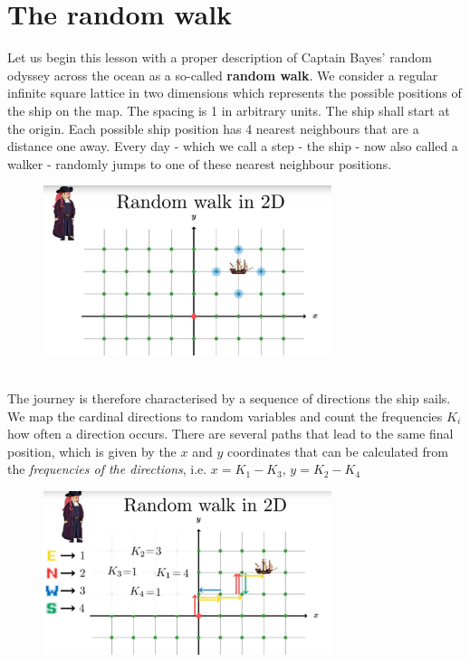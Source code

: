 \documentclass[12pt, a4paper]{scrartcl}
\begin{document}
\section*{The random walk}
Let us begin this lesson with a proper description of Captain Bayes' random odyssey across the ocean as a so-called \textbf{random walk}.
We consider a regular infinite square lattice in two dimensions which represents the possible positions of the ship on the map. The spacing is 1 in arbitrary units. The ship shall start at the origin. Each possible ship position has 4 nearest neighbours that are a distance one away. Every day - which we call a step - the ship - now also called a walker -  randomly jumps to one of these nearest neighbour positions. %
 \begin{figure}[H]
	\centering
	\includegraphics[width=0.75\textwidth]{5_1.png}
\end{figure}
\\
The journey is therefore characterised by a sequence of directions the ship sails. 
We map the cardinal directions to random variables and count the frequencies $K_i$ how often a direction occurs.
There are several paths that lead to the same final position, which is given by the $x$ and $y$ coordinates that can be calculated from the \textit{frequencies of the directions}, i.e. $x = K_1-K_3$, $y=K_2-K_4$\\
 \begin{figure}[H]
	\centering
	\includegraphics[width=0.75\textwidth]{5_2.png}
\end{figure}
\end{document}
